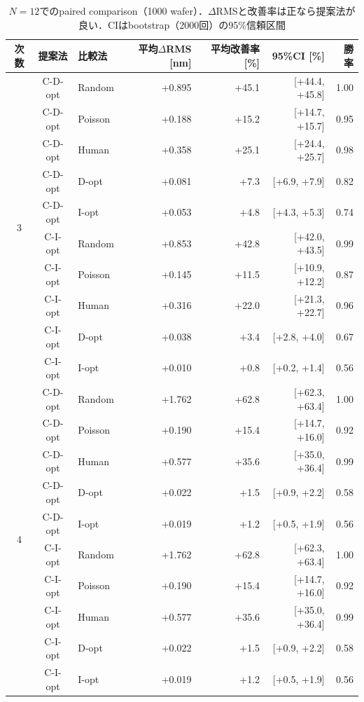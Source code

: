 \documentclass[10.5pt,a4paper]{ltjsarticle}
\begin{document}
\begin{table}[htbp]
  \centering
  \caption{$N=12$でのpaired comparison（1000 wafer）．$\Delta$RMSと改善率は正なら提案法が良い．CIはbootstrap（2000回）の95\%信頼区間}
  \label{tab:paired}
  \small
\begin{tabular}{cclrrrr}
\toprule
次数 & 提案法 & 比較法 & 平均$\Delta$RMS [nm] & 平均改善率 [\%] & 95\%CI [\%] & 勝率 \\
\midrule
\multirow{10}{*}{3} & C-D-opt & Random & +0.895 & +45.1 & [+44.4, +45.8] & 1.00 \\
 & C-D-opt & Poisson & +0.188 & +15.2 & [+14.7, +15.7] & 0.95 \\
 & C-D-opt & Human & +0.358 & +25.1 & [+24.4, +25.7] & 0.98 \\
 & C-D-opt & D-opt & +0.081 & +7.3 & [+6.9, +7.9] & 0.82 \\
 & C-D-opt & I-opt & +0.053 & +4.8 & [+4.3, +5.3] & 0.74 \\
 & C-I-opt & Random & +0.853 & +42.8 & [+42.0, +43.5] & 0.99 \\
 & C-I-opt & Poisson & +0.145 & +11.5 & [+10.9, +12.2] & 0.87 \\
 & C-I-opt & Human & +0.316 & +22.0 & [+21.3, +22.7] & 0.96 \\
 & C-I-opt & D-opt & +0.038 & +3.4 & [+2.8, +4.0] & 0.67 \\
 & C-I-opt & I-opt & +0.010 & +0.8 & [+0.2, +1.4] & 0.56 \\
\midrule
\multirow{10}{*}{4} & C-D-opt & Random & +1.762 & +62.8 & [+62.3, +63.4] & 1.00 \\
 & C-D-opt & Poisson & +0.190 & +15.4 & [+14.7, +16.0] & 0.92 \\
 & C-D-opt & Human & +0.577 & +35.6 & [+35.0, +36.4] & 0.99 \\
 & C-D-opt & D-opt & +0.022 & +1.5 & [+0.9, +2.2] & 0.58 \\
 & C-D-opt & I-opt & +0.019 & +1.2 & [+0.5, +1.9] & 0.56 \\
 & C-I-opt & Random & +1.762 & +62.8 & [+62.3, +63.4] & 1.00 \\
 & C-I-opt & Poisson & +0.190 & +15.4 & [+14.7, +16.0] & 0.92 \\
 & C-I-opt & Human & +0.577 & +35.6 & [+35.0, +36.4] & 0.99 \\
 & C-I-opt & D-opt & +0.022 & +1.5 & [+0.9, +2.2] & 0.58 \\
 & C-I-opt & I-opt & +0.019 & +1.2 & [+0.5, +1.9] & 0.56 \\

\end{tabular}
\end{table}
\end{document}
